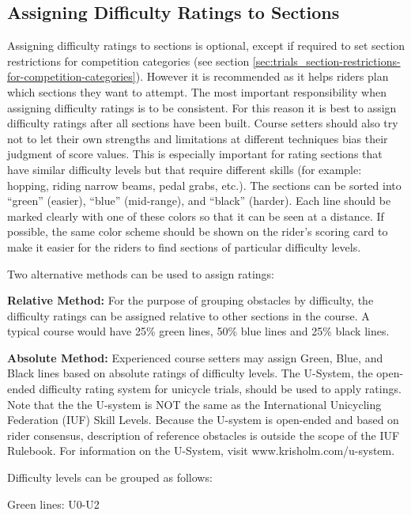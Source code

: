 \subsection{Assigning Difficulty Ratings to Sections \label{subsec:trials_guidelines-for-course-setters_assigning-difficulty-ratings}}
Assigning difficulty ratings to sections is optional, except if required to set section restrictions for competition categories (see section \ref{sec:trials_section-restrictions-for-competition-categories}).
However it is recommended as it helps riders plan which sections they want to attempt.
The most important responsibility when assigning difficulty ratings is to be consistent.
For this reason it is best to assign difficulty ratings after all sections have been built.
Course setters should also try not to let their own strengths and limitations at different techniques bias their judgment of score values.
This is especially important for rating sections that have similar difficulty levels but that require different skills (for example: hopping, riding narrow beams, pedal grabs, etc.).
The sections can be sorted into ``green'' (easier), ``blue'' (mid-range), and ``black'' (harder).
Each line should be marked clearly with one of these colors so that it can be seen at a distance.
If possible, the same color scheme should be shown on the rider's scoring card to make it easier for the riders to find sections of particular difficulty levels.

Two alternative methods can be used to assign ratings:

\textbf{Relative Method:}
For the purpose of grouping obstacles by difficulty, the difficulty ratings can be assigned relative to other sections in the course.
A typical course would have 25\% green lines, 50\% blue lines and 25\% black lines.

\textbf{Absolute Method:}
Experienced course setters may assign Green, Blue, and Black lines based on absolute ratings of difficulty levels.
The U-System, the open-ended difficulty rating system for unicycle trials, should be used to apply ratings.
Note that the the U-system is NOT the same as the International Unicycling Federation (IUF) Skill Levels.
Because the U-system is open-ended and based on rider consensus, description of reference obstacles is outside the scope of the IUF Rulebook.
For information on the U-System, visit www.krisholm.com/u-system.

Difficulty levels can be grouped as follows:

Green lines: U0-U2


